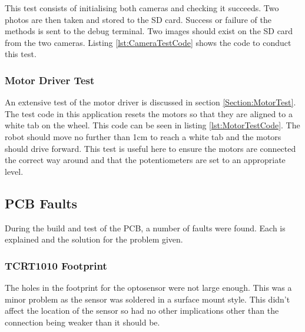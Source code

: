 This test consists of initialising both cameras and checking it succeeds. Two photos are then taken and stored to the SD card. Success or failure of the methods is sent to the debug terminal. Two images should exist on the SD card from the two cameras. Listing \ref{lst:CameraTestCode} shows the code to conduct this test.


\subsubsection{Motor Driver Test}\label{Motor:Test}
An extensive test of the motor driver is discussed in section \ref{Section:MotorTest}. The test code in this application resets the motors so that they are aligned to a white tab on the wheel. This code can be seen in listing \ref{lst:MotorTestCode}. The robot should move no further than 1cm to reach a white tab and the motors should drive forward. This test is useful here to ensure the motors are connected the correct way around and that the potentiometers are set to an appropriate level.



\subsection{PCB Faults}
During the build and test of the PCB, a number of faults were found. Each is explained and the solution for the problem given. 
\subsubsection{TCRT1010 Footprint}
The holes in the footprint for the optosensor were not large enough. This was a minor problem as the sensor was soldered in a surface mount style. This didn't affect the location of the sensor so had no other implications other than the connection being weaker than it should be. 

